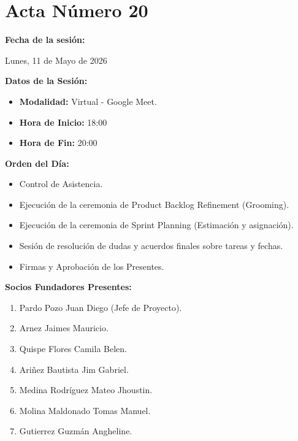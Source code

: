 \newpage
\section{Acta Número 20}
\label{sec:acta20}

\noindent \textbf{Fecha de la sesión:}\par
Lunes, 11 de Mayo de 2026

\vspace*{0.5cm}
\noindent \textbf{Datos de la Sesión:}
\vspace{-0.2cm}
\begin{itemize}[noitemsep]
\item \textbf{Modalidad:} Virtual - Google Meet.
\item \textbf{Hora de Inicio:} 18:00
\item \textbf{Hora de Fin:} 20:00
\end{itemize}

\vspace*{0.5cm}
\noindent \textbf{Orden del Día:}
\vspace{-0.2cm}
\begin{itemize}[noitemsep]
\item Control de Asistencia.
\item Ejecución de la ceremonia de Product Backlog Refinement (Grooming).
\item Ejecución de la ceremonia de Sprint Planning (Estimación y asignación).
\item Sesión de resolución de dudas y acuerdos finales sobre tareas y fechas.
\item Firmas y Aprobación de los Presentes.
\end{itemize}

\vspace*{0.5cm}
\noindent \textbf{Socios Fundadores Presentes:}
\vspace{-0.2cm}
\begin{enumerate}[noitemsep]
\item Pardo Pozo Juan Diego (Jefe de Proyecto).
\item Arnez Jaimes Mauricio.
\item Quispe Flores Camila Belen.
\item Ariñez Bautista Jim Gabriel.
\item Medina Rodríguez Mateo Jhoustin.
\item Molina Maldonado Tomas Manuel.
\item Gutierrez Guzmán Angheline.
\end{enumerate}

